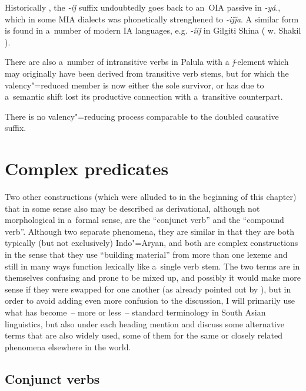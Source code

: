 Historically \citep[316--317]{masica1991}, the \textit{-íǰ} suffix undoubtedly goes back to an~OIA passive in \textit{-yá}., which in some MIA dialects was phonetically strenghened to \textit{-iǰǰa}. A similar form is found in a~number of modern IA languages, e.g. \textit{-íiǰ} in Gilgiti Shina (\citeauthor{radloffshakil1998} w. Shakil \citeyear[116]{radloffshakil1998}). 



There are also a~number of intransitive verbs in Palula with a \textit{ǰ}-element which may originally have been derived from transitive verb stems, but for which the valency"=reduced member is now either the sole survivor, or has due to a~semantic shift lost its productive connection with a~transitive counterpart.



There is no valency"=reducing process comparable to the doubled causative suffix.


\section{Complex predicates}
\label{sec:8-6}


Two other constructions (which were alluded to in the beginning of this chapter) that in some sense also may be described as derivational, although not morphological in a~formal sense, are the ``conjunct verb'' and the ``compound verb''. Although two separate phenomena, they are similar in that they are both typically (but not exclusively) Indo"=Aryan, and both are complex constructions in the sense that they use ``building material'' from more than one lexeme and still in many ways function lexically like a~single verb stem. The two terms are in themselves confusing and prone to be mixed up, and possibly it would make more sense if they were swapped for one another (as already pointed out by \citealt[326]{masica1991}), but in order to avoid adding even more confusion to the discussion, I will primarily use what has become~-- more or less~-- standard terminology in South Asian linguistics, but also under each heading mention and discuss some alternative terms that are also widely used, some of them for the same or closely related phenomena elsewhere in the world.


\subsection{Conjunct verbs}
\label{subsec:8-6-1}


